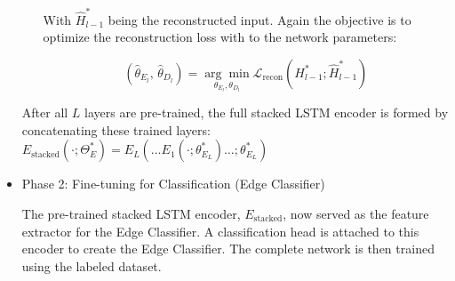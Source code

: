 \begin{itemize}
\begin{itemize}
      With \(\hat H^*_{l-1}\) being the reconstructed input. Again the objective is to optimize the reconstruction loss with to the network parameters:

      \[(\hat \theta_{E_l},\,\hat \theta_{D_l}) = \underset{\theta_{E_l}, \theta_{D_l}} {\arg\min} \mathcal L_{\text{recon}}(H^*_{l-1}; \hat H^*_{l-1})\]
  \end{itemize}
  After all \(L\) layers are pre-trained, the full stacked LSTM encoder is formed by concatenating these trained layers: \(E_\text{stacked}(\cdot; \Theta^*_{E}) = E_L(\ldots E_1(\cdot; \theta^*_{E_L}) \ldots;\theta^*_{E_L})\)
  
  \item Phase 2: Fine-tuning for Classification (Edge Classifier)

  The pre-trained stacked LSTM encoder, \(E_\text{stacked}\), now served as the feature extractor for the Edge Classifier. A classification head is attached to this encoder to create the Edge Classifier. The complete network is then trained using the labeled dataset.
\end{itemize}
